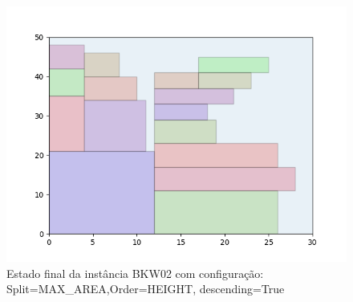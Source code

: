 \begin{figure}[H]
    \centering
    \caption[]{Estado final da instância BKW02 com configuração: Split=MAX_AREA,Order=HEIGHT, descending=True}
    \label{fig:bkw02-max_area-height-true}
    \includegraphics[scale=0.5]{output/figures/bkw/bkw02/max_area/height/true/00}
\end{figure}